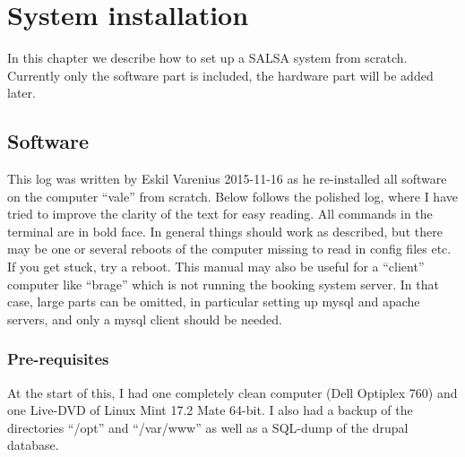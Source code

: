\chapter{System installation}
In this chapter we describe how to set up a SALSA system from scratch.
Currently only the software part is included, the hardware part will be added
later.

\section{Software}
This log was written by Eskil Varenius 2015-11-16 as he re-installed all
software on the computer “vale” from scratch. Below follows the polished log,
where I have tried to improve the clarity of the text for easy reading. All
commands in the terminal are in bold face. In general things should work as
described, but there may be one or several reboots of the computer missing to
read in config files etc. If you get stuck, try a reboot. This manual may also
be useful for a “client” computer like “brage” which is not running the booking
system server. In that case, large parts can be omitted, in particular setting
up mysql and apache servers, and only a mysql client should be needed.

\subsection{Pre-requisites}
At the start of this, I had one completely clean computer (Dell Optiplex 760)
and one Live-DVD of Linux Mint 17.2 Mate 64-bit. I also had a backup of the
directories “/opt” and “/var/www” as well as a SQL-dump of the drupal database.

